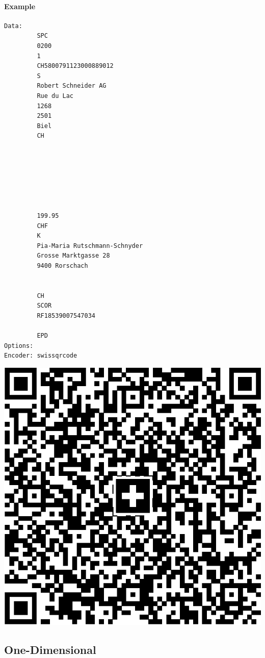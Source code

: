 \hypertarget{example-1}{%
\paragraph{Example}\label{example-1}}

\begin{verbatim}
Data:
         SPC
         0200
         1
         CH5800791123000889012
         S
         Robert Schneider AG
         Rue du Lac
         1268
         2501
         Biel
         CH
         
         
         
         
         
         
         
         199.95
         CHF
         K
         Pia-Maria Rutschmann-Schnyder
         Grosse Marktgasse 28
         9400 Rorschach
         
         
         CH
         SCOR
         RF18539007547034
         
         EPD
Options:
Encoder: swissqrcode
\end{verbatim}

\includegraphics{images/swissqrcode-1.eps}

\hypertarget{one-dimensional}{%
\subsection{One-Dimensional}\label{one-dimensional}}

